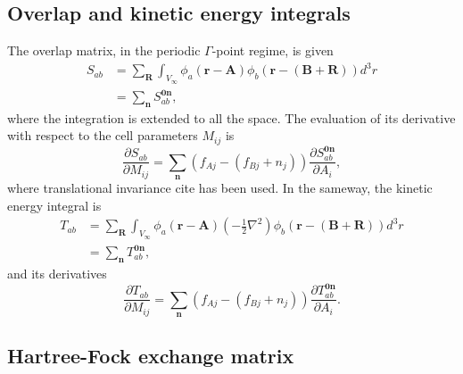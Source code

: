 \documentclass[pra,aps,twocolumn,showkeys,twocolumngrid,superbib]{revtex4}
\def\n{\mathbf{n}}
\def\0{\mathbf{0}}
\def\r{\mathbf{r}}
\def\R{\mathbf{R}}
\def\A{\mathbf{A}}
\def\B{\mathbf{B}}
\begin{document}
\subsection{Overlap and kinetic energy integrals}
The overlap matrix, in the periodic $\Gamma$-point regime, is given
\begin{equation}
  \begin{split}
    S_{ab}&=\sum_{\R}\int_{V_\infty}\phi_a(\r-\A)\phi_b(\r-(\B+\R))d^3r\\
    &=\sum_{\n}S_{ab}^{{\0\n}},
  \end{split}
\end{equation}
where the integration is extended to all the space.
The evaluation of its derivative with respect to the cell parameters $M_{ij}$
is 
\begin{equation}\label{Eq:OvDer}
  \frac{\partial S_{ab}}{\partial M_{ij}}=\sum_{\n}(f_{Aj}-(f_{Bj}+n_j))
  \frac{\partial S_{ab}^{{\0\n}}}{\partial A_i},
\end{equation}
where translational invariance cite has been used. 
In the sameway, the kinetic energy integral is
\begin{equation}
  \begin{split}
    T_{ab}&=\sum_{\R}\int_{V_\infty}\phi_a(\r-\A)\left(-\frac{1}{2}\nabla^2\right)
    \phi_b(\r-(\B+\R))d^3r\\
    &=\sum_{\n}T_{ab}^{{\0\n}},
  \end{split}
\end{equation}
and its derivatives
\begin{equation}
  \frac{\partial T_{ab}}{\partial M_{ij}}=\sum_{\n}(f_{Aj}-(f_{Bj}+n_j))
  \frac{\partial T_{ab}^{{\0\n}}}{\partial A_i}.
\end{equation}


\subsection{Hartree-Fock exchange matrix}



\end{document}
